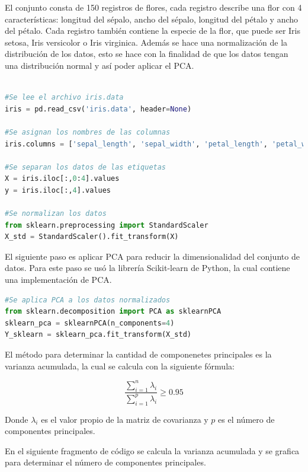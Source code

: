 \documentclass[conference]{IEEEtran}
\begin{document}
El conjunto consta de 150 registros de flores, cada registro describe una flor con 4 características: longitud del sépalo, ancho del sépalo, longitud del pétalo y ancho del pétalo. Cada registro también contiene la especie de la flor, que puede ser Iris setosa, Iris versicolor o Iris virginica. Además se hace una normalización de la distribución de los datos, esto se hace con la finalidad de que los datos tengan una distribución normal y así poder aplicar el PCA.

\begin{lstlisting}[language=Python, caption=Carga de datos y normalización]

#Se lee el archivo iris.data
iris = pd.read_csv('iris.data', header=None)

#Se asignan los nombres de las columnas
iris.columns = ['sepal_length', 'sepal_width', 'petal_length', 'petal_width', 'class']

#Se separan los datos de las etiquetas
X = iris.iloc[:,0:4].values
y = iris.iloc[:,4].values

#Se normalizan los datos
from sklearn.preprocessing import StandardScaler
X_std = StandardScaler().fit_transform(X)
\end{lstlisting}

El siguiente paso es aplicar PCA para reducir la dimensionalidad del conjunto de datos. Para este paso se usó la librería Scikit-learn de Python, la cual contiene una implementación de PCA. 

\begin{lstlisting}[language=Python, caption=Aplicación de PCA]
    #Se aplica PCA a los datos normalizados
from sklearn.decomposition import PCA as sklearnPCA
sklearn_pca = sklearnPCA(n_components=4)
Y_sklearn = sklearn_pca.fit_transform(X_std)
\end{lstlisting}

El método para determinar la cantidad de componenetes principales es la varianza acumulada, la cual se calcula con la siguiente fórmula:

\begin{equation}
    \frac{\sum_{i=1}^{n} \lambda_{i}}{\sum_{i=1}^{p} \lambda_{i}} \geq 0.95
\end{equation}

Donde $\lambda_{i}$ es el valor propio de la matriz de covarianza y $p$ es el número de componentes principales.

En el siguiente fragmento de código se calcula la varianza acumulada y se grafica para determinar el número de componentes principales.
\end{document}
